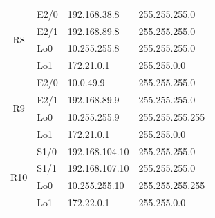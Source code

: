 \documentclass[12pt,twoside,a4paper]{report}
\begin{document}
\begin{table}[!htbp]
\begin{tabular}{|c|l|l|l|}
\multirow{4}{*}{R8}  & E2/0                                    & 192.168.38.8                            & 255.255.255.0                       \\ \cline{2-4} 
                     & E2/1                                    & 192.168.89.8                            & 255.255.255.0                       \\ \cline{2-4} 
                     & Lo0                                     & 10.255.255.8                            & 255.255.255.0                       \\ \cline{2-4} 
                     & Lo1                                     & 172.21.0.1                              & 255.255.0.0                         \\ \hline
\multirow{4}{*}{R9}  & E2/0                                    & 10.0.49.9                               & 255.255.255.0                       \\ \cline{2-4} 
                     & E2/1                                    & 192.168.89.9                            & 255.255.255.0                       \\ \cline{2-4} 
                     & Lo0                                     & 10.255.255.9                            & 255.255.255.255                     \\ \cline{2-4} 
                     & Lo1                                     & 172.21.0.1                              & 255.255.0.0                         \\ \hline
\multirow{4}{*}{R10} & S1/0                                    & 192.168.104.10                          & 255.255.255.0                       \\ \cline{2-4} 
                     & S1/1                                    & 192.168.107.10                          & 255.255.255.0                       \\ \cline{2-4} 
                     & Lo0                                     & 10.255.255.10                           & 255.255.255.255                     \\ \cline{2-4} 
                     & Lo1                                     & 172.22.0.1                              & 255.255.0.0                         \\ \hline
\end{tabular}
\end{table}


\clearpage
\end{document}

